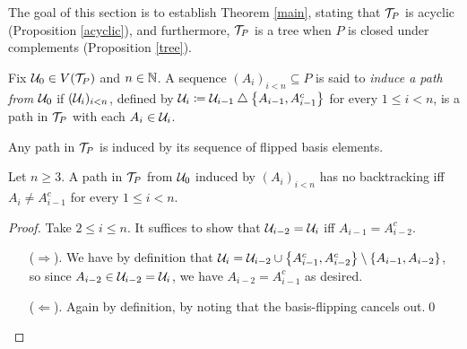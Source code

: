 \documentclass{amsart}
\begin{document}
    The goal of this section is to establish Theorem \ref{main}, stating that $\mathcal{T}_P$ is acyclic (Proposition \ref{acyclic}), and furthermore, $\mathcal{T}_P$ is a tree when $P$ is closed under complements (Proposition \ref{tree}).

    \begin{definition}
        Fix $\mathcal{U}_0\in V(\mathcal{T}_P)$ and $n\in\mathbb{N}$. A sequence $(A_i)_{i<n}\subseteq P$ is said to \textit{induce a path from $\mathcal{U}_0$} if $(\mathcal{U}_i)_{i<n}$, defined by $\mathcal{U}_i\coloneqq\mathcal{U}_{i-1}\bigtriangleup\left\{A_{i-1},A_{i-1}^c\right\}$ for every $1\leq i<n$, is a path in $\mathcal{T}_P$ with each $A_i\in\mathcal{U}_i$.
    \end{definition}

    \begin{remark}
        Any path in $\mathcal{T}_P$ is induced by its sequence of flipped basis elements.
    \end{remark}

    \begin{lemma}\label{no-backtrack}
        Let $n\geq3$. A path in $\mathcal{T}_P$ from $\mathcal{U}_0$ induced by $(A_i)_{i<n}$ has no backtracking iff $A_i\neq A_{i-1}^c$ for every $1\leq i<n$.
    \end{lemma}
    \begin{proof}
        Take $2\leq i\leq n$. It suffices to show that $\mathcal{U}_{i-2}=\mathcal{U}_i$ iff $A_{i-1}=A_{i-2}^c$.
        \begin{itemize}
            \item[($\Rightarrow$).] We have by definition that $\mathcal{U}_i=\mathcal{U}_{i-2}\cup\left\{A_{i-1}^c,A_{i-2}^c\right\}\setminus\left\{A_{i-1},A_{i-2}\right\}$, so since $A_{i-2}\in\mathcal{U}_{i-2}=\mathcal{U}_i$, we have $A_{i-2}=A_{i-1}^c$ as desired.
            \item[($\Leftarrow$).] Again by definition, by noting that the basis-flipping cancels out.\qed
        \end{itemize}
    \end{proof}
\end{document}
